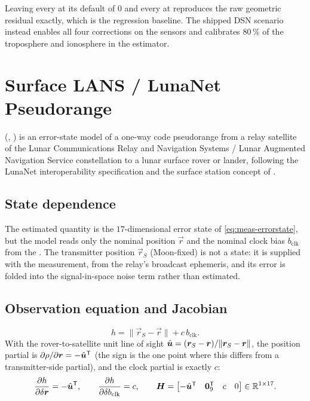 \begin{lupntnote}
  Leaving every  at its default of $0$ and every
   at  reproduces the raw geometric residual
  exactly, which is the regression baseline. The shipped DSN scenario instead
  enables all four corrections on the sensors and calibrates $80\,\%$ of the
  troposphere and ionosphere in the estimator.
\end{lupntnote}

\section{Surface LANS / LunaNet Pseudorange}
\label{sec:meas-lans}

(,
) is an error-state model
of a one-way code pseudorange from a relay satellite of the Lunar
Communications Relay and Navigation Systems / Lunar Augmented Navigation
Service constellation to a lunar surface rover or lander, following the
LunaNet interoperability specification \citep{lunanet2022} and the surface
station concept of \citet{casadesus2025surface}.

\subsection{State dependence}

The estimated quantity is the $17$-dimensional error state of
\cref{eq:meas-errorstate}, but the model reads only the nominal position
$\vec{r}$ and the nominal clock bias $b_\mathrm{clk}$ from the
. The transmitter position $\vec{r}_S$ (Moon-fixed) is not
a state: it is supplied with the measurement, from the relay's broadcast
ephemeris, and its error is folded into the signal-in-space noise term rather
than estimated.

\subsection{Observation equation and Jacobian}

\begin{equation}
  h = \lVert \vec{r}_S - \vec{r} \rVert + c\,b_\mathrm{clk} .
  \label{eq:meas-lans-h}
\end{equation}
With the rover-to-satellite unit line of sight
$\hat{\bm{u}} = (\bm{r}_S - \bm{r})/\lVert \bm{r}_S - \bm{r}\rVert$, the
position partial is $\partial\rho/\partial\bm{r} = -\hat{\bm{u}}^{\mathsf{T}}$ (the
sign is the one point where this differs from a transmitter-side partial), and
the clock partial is exactly $c$:
\begin{equation}
  \frac{\partial h}{\partial \delta\bm{r}} = -\hat{\bm{u}}^{\mathsf{T}},
  \qquad
  \frac{\partial h}{\partial \delta b_\mathrm{clk}} = c,
  \qquad
  \bm{H} =
  \begin{bmatrix}
    -\hat{\bm{u}}^{\mathsf{T}} & \bm{0}^{\mathsf{T}}_{9} & c & 0
  \end{bmatrix}
  \in \mathbb{R}^{1\times 17}.
  \label{eq:meas-lans-jac}
\end{equation}


